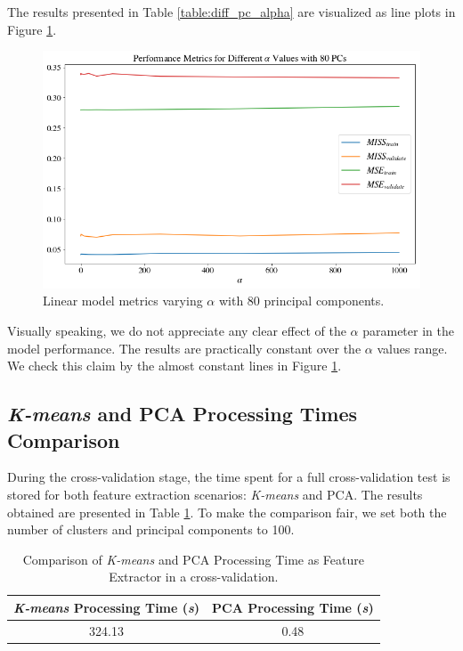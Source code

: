 \documentclass{article}
\begin{document}
The results presented in Table \ref{table:diff_pc_alpha} are visualized as line plots in Figure \ref{fig:diff_pc_principal}.

\begin{figure}[h!]
    \centering
    \includegraphics[scale=0.42]{images/cv_pcs_alpha.png}
    \caption{Linear model metrics varying $\alpha$ with 80 principal components.}
    \label{fig:diff_pc_principal}
\end{figure}

Visually speaking, we do not appreciate any clear effect of the $\alpha$ parameter in the model performance. The results are practically constant over the $\alpha$ values range. We check this claim by the almost constant lines in Figure \ref{fig:diff_pc_principal}.

\subsection{\textit{K-means} and PCA Processing Times Comparison}
During the cross-validation stage, the time spent for a full cross-validation test is stored for both feature extraction scenarios: \textit{K-means} and PCA. The results obtained are presented in Table \ref{table:times}. To make the comparison fair, we set both the number of clusters and principal components to 100.

\begin{table}[h!]
\begin{center}
 \begin{tabular}{||c | c||} 
 \hline
 \textit{K-means} Processing Time (\textit{s}) & PCA Processing Time (\textit{s}) \\ [0.5ex]
 \hline\hline
  324.13 & 0.48\\ 
 \hline
\end{tabular}
\caption{Comparison of \textit{K-means} and PCA Processing Time as Feature Extractor in a cross-validation.}
\label{table:times}
\end{center}
\end{table}
\end{document}
